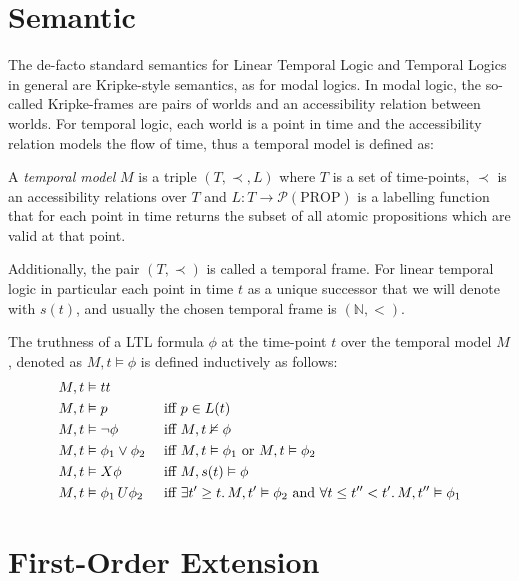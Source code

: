 \section{Semantic}

The de-facto standard semantics for Linear Temporal Logic and Temporal Logics in general are Kripke-style semantics, as
for modal logics. In modal logic, the so-called Kripke-frames are pairs of worlds and an accessibility relation between
worlds. For temporal logic, each world is a point in time and the accessibility relation models the flow of time, thus a
temporal model is defined as:

\begin{definition}
  A \emph{temporal model} $M$ is a triple $(T, \prec, L)$ where $T$ is a set of time-points, $\prec$ is an accessibility
  relations over $T$ and $L : T \to \mathcal{P}(\text{PROP})$ is a labelling function that for each point in time
  returns the subset of all atomic propositions which are valid at that point.
\end{definition}

Additionally, the pair $(T, \prec)$ is called a temporal frame. For linear temporal logic in particular each point in
time $t$ as a unique successor that we will denote with $s(t)$, and usually the chosen temporal frame is $(\mathbb{N},
<)$.
\begin{definition}
  The truthness of a LTL formula $\phi$ at the time-point $t$ over the temporal model $M$, denoted as
  $M, t \vDash \phi$ is defined inductively as follows:
  \begin{align*}
    M, t &\vDash tt && \\
    M, t &\vDash p &&\text{ iff } p \in L(t) \\
    M, t &\vDash \neg\phi &&\text{ iff } M, t \nvDash \phi \\
    M, t &\vDash \phi_1 \lor \phi_2 &&\text{ iff } M, t \vDash \phi_1 \text{ or } M, t \vDash \phi_2 \\
    M, t &\vDash X{\phi} &&\text{ iff } M, s(t) \vDash \phi \\
    M, t &\vDash {\phi_1}\,U {\phi_2} &&\text{ iff } \exists t' \geq t \ldotp M, t' \vDash \phi_2 \text{ and } \forall t
      \leq t'' < t' \ldotp M, t'' \vDash \phi_1 \\
  \end{align*}
\end{definition}

\section{First-Order Extension}

